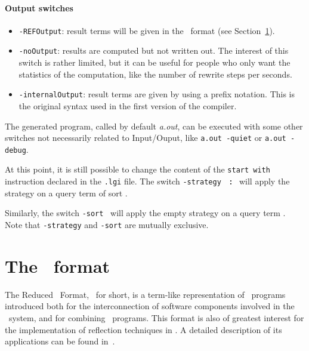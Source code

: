 \paragraph{Output switches}

\begin{itemize}

\item \verb|-REFOutput|: result terms will be given in the
  \REF\ format (see Section~\ref{ref_format}). 

\item \verb|-noOutput|: results are computed but not
  written out. The interest of this switch is rather limited, but it
  can be useful for people who only want the statistics of the
  computation, like the number of rewrite steps per seconds. 

\item \verb|-internalOutput|: result terms are given by using a prefix 
  notation. This is the original syntax used in the first version of
  the compiler. 

\end{itemize}

The generated program, called by default \textit{a.out}, can 
be executed with some other switches not necessarily related to
Input/Ouput, like \verb|a.out -quiet| or \verb|a.out -debug|.


At this point, it is still possible to change the content of the
\verb|start with| instruction declared in the \verb|.lgi| file. The switch
\verb|-strategy|~~{\bf :}~ will apply the
strategy  on a query term of sort . 


Similarly, the switch \verb|-sort|~ will apply 
the empty strategy on a query term . Note that
\verb|-strategy| and \verb|-sort| are mutually exclusive. 



\section{The \REF\ format}
\label{ref_format}


The Reduced \elan\ Format, \REF\ for short, is a term-like
representation of \elan\ programs introduced both for the
interconnection of software components involved in the \elan\ system,
and for combining \elan\ programs. This format is also of greatest
interest for the implementation of reflection techniques in \elan. 
A detailed description of its applications can be found
in~\cite{BorovanskyKKMR-WRLA98}. 

